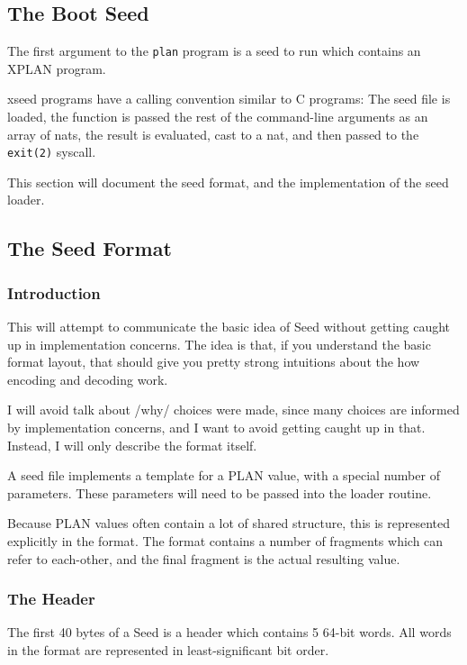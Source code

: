 \subsection{The Boot Seed}

The first argument to the \lstinline|plan| program is a seed to run
which contains an XPLAN program.

xseed programs have a calling convention similar to C programs: The
seed file is loaded, the function is passed the rest of the command-line
arguments as an array of nats, the result is evaluated, cast to a nat,
and then passed to the \lstinline|exit(2)| syscall.

This section will document the seed format, and the implementation of
the seed loader.

\subsection{The Seed Format}

\subsubsection{Introduction}

This will attempt to communicate the basic idea of Seed without getting
caught up in implementation concerns. The idea is that, if you
understand the basic format layout, that should give you pretty strong
intuitions about the how encoding and decoding work.

I will avoid talk about /why/ choices were made, since many choices are
informed by implementation concerns, and I want to avoid getting caught
up in that. Instead, I will only describe the format itself.

A seed file implements a template for a PLAN value, with a special
number of parameters.  These parameters will need to be passed into the
loader routine.

Because PLAN values often contain a lot of shared structure, this is
represented explicitly in the format.  The format contains a number of
fragments which can refer to each-other, and the final fragment is the
actual resulting value.

\subsubsection{The Header}

The first 40 bytes of a Seed is a header which contains 5 64-bit words.
All words in the format are represented in least-significant bit order.


